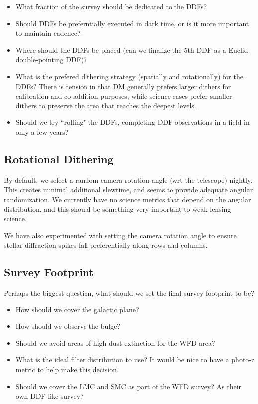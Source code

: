 \begin{itemize}
    \item{What fraction of the survey should be dedicated to the DDFs?}
    \item{Should DDFs be preferntially executed in dark time, or is it more important to maintain cadence?}
    \item{Where should the DDFs be placed (can we finalize the 5th DDF as a Euclid double-pointing DDF)?}
    \item{What is the prefered dithering strategy (spatially and rotationally) for the DDFs? There is tension in that DM generally prefers larger dithers for calibration and co-addition purposes, while science cases prefer smaller dithers to preserve the area that reaches the deepest levels.}
    \item{Should we try ``rolling" the DDFs, completing DDF observations in a field in only a few years?}
\end{itemize}

\subsection{Rotational Dithering}

By default, we select a random camera rotation angle (wrt the telescope) nightly. This creates minimal additional slewtime, and seems to provide adequate angular randomization.  We currently have no science metrics that depend on the angular distribution, and this should be something very important to weak lensing science.

We have also experimented with setting the camera rotation angle to ensure stellar diffraction spikes fall preferentially along rows and columns. 

\subsection{Survey Footprint}

Perhaps the biggest question, what should we set the final survey footprint to be?

\begin{itemize}
    \item{How should we cover the galactic plane?}
    \item{How should we observe the bulge?}
    \item{Should we avoid areas of high dust extinction for the WFD area?}
    \item{What is the ideal filter distribution to use? It would be nice to have a photo-z metric to help make this decision.}
    \item{Should we cover the LMC and SMC as part of the WFD survey? As their own DDF-like survey?}
\end{itemize}

